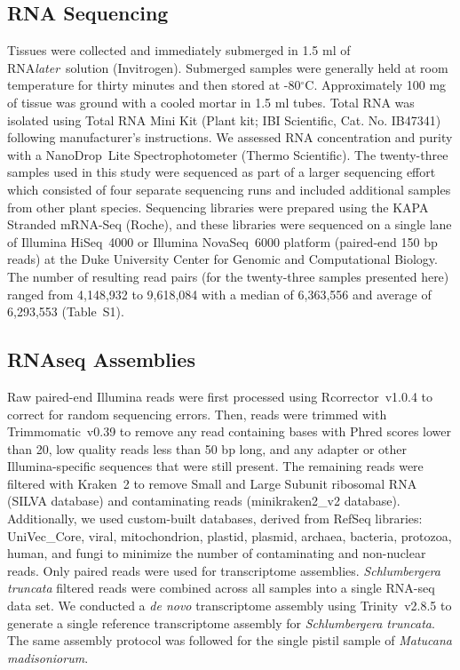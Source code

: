 \documentclass[11pt,letterpaper,titlepage]{article}
\begin{document}
\begin{linenumbers}
\subsection*{RNA Sequencing}

Tissues were collected and immediately submerged in 1.5 ml of RNA\textit{later}\texttrademark~solution (Invitrogen).
Submerged samples were generally held at room temperature for thirty minutes and then stored at -80$^{\circ}$C.
Approximately 100 mg of tissue was ground with a cooled mortar in 1.5 ml tubes.
Total RNA was isolated using Total RNA Mini Kit (Plant kit; IBI Scientific, Cat. No. IB47341) following manufacturer's instructions.
We assessed RNA concentration and purity with a NanoDrop\texttrademark~Lite Spectrophotometer (Thermo Scientific).
The twenty-three samples used in this study were sequenced as part of a larger sequencing effort which consisted of four separate sequencing runs and included additional samples from other plant species.
Sequencing libraries were prepared using the KAPA Stranded mRNA-Seq (Roche), and these libraries were sequenced on a single lane of Illumina \mbox{HiSeq}~4000 or Illumina \mbox{NovaSeq}~6000 platform (paired-end 150 bp reads) at the Duke University Center for Genomic and Computational Biology.
The number of resulting read pairs (for the twenty-three samples presented here) ranged from 4,148,932 to 9,618,084 with a median of 6,363,556 and average of 6,293,553 (Table~S1).

\subsection*{RNAseq Assemblies}

Raw paired-end Illumina reads were first processed using \mbox{Rcorrector}~v1.0.4 \cite{song2015} to correct for random sequencing errors.
Then, reads were trimmed with \mbox{Trimmomatic}~v0.39 \cite{bolger2014} to remove any read containing bases with Phred scores lower than 20, low quality reads less than 50 bp long, and any adapter or other Illumina-specific sequences that were still present.
The remaining reads were filtered with \mbox{Kraken}~2 \cite{wood2019} to remove Small and Large Subunit ribosomal RNA (SILVA database) \cite{quast2013} and contaminating reads (minikraken2\_v2 database).
Additionally, we used custom-built databases, derived from RefSeq libraries: UniVec\_Core, viral, mitochondrion, plastid, plasmid, archaea, bacteria, protozoa, human, and fungi to minimize the number of contaminating and non-nuclear reads.
Only paired reads were used for transcriptome assemblies.
\textit{Schlumbergera truncata} filtered reads were combined across all samples into a single RNA-seq data set.
We conducted a \textit{de novo} transcriptome assembly using \mbox{Trinity}~v2.8.5 \cite{grabherr2011} to generate a single reference transcriptome assembly for \textit{Schlumbergera truncata}.
The same assembly protocol was followed for the single pistil sample of \textit{Matucana madisoniorum}.


\end{linenumbers}
\end{document}
